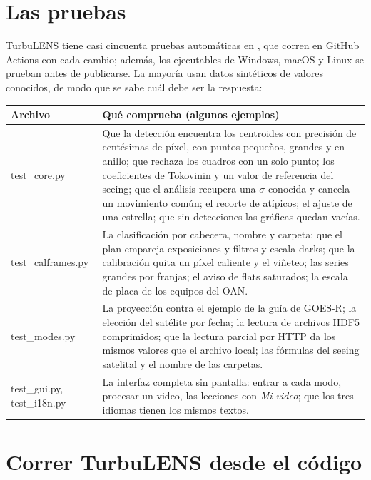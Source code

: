 
\section{Las pruebas}

TurbuLENS tiene casi cincuenta pruebas automáticas en , que corren en GitHub Actions con cada cambio; además, los ejecutables de Windows, macOS y Linux se prueban antes de publicarse.
La mayoría usan datos sintéticos de valores conocidos, de modo que se sabe cuál debe ser la respuesta:

\begin{table}[H]
\centering\small
\begin{tabularx}{\linewidth}{@{}>{\ttfamily}l Y@{}}
\toprule
\normalfont Archivo & Qué comprueba (algunos ejemplos)\\
\midrule
test\_core.py & Que la detección encuentra los centroides con precisión de centésimas de píxel, con puntos pequeños,
grandes y en anillo; que rechaza los cuadros con un solo punto; los coeficientes de Tokovinin y un valor de referencia del
seeing; que el análisis recupera una $\sigma$ conocida y cancela un movimiento común; el recorte de atípicos; el ajuste de
una estrella; que sin detecciones las gráficas quedan vacías.\\
test\_calframes.py & La clasificación por cabecera, nombre y carpeta; que el plan empareja exposiciones y filtros y escala
darks; que la calibración quita un píxel caliente y el viñeteo; las series grandes por franjas; el aviso de flats
saturados; la escala de placa de los equipos del OAN.\\
test\_modes.py & La proyección contra el ejemplo de la guía de GOES-R; la elección del satélite por fecha; la lectura de
archivos HDF5 comprimidos; que la lectura parcial por HTTP da los mismos valores que el archivo local; las fórmulas del seeing
satelital y el nombre de las carpetas.\\
test\_gui.py, test\_i18n.py & La interfaz completa sin pantalla: entrar a cada modo, procesar un video, las lecciones con
\emph{Mi video}; que los tres idiomas tienen los mismos textos.\\
\bottomrule
\end{tabularx}
\end{table}

\section{Correr TurbuLENS desde el código}

